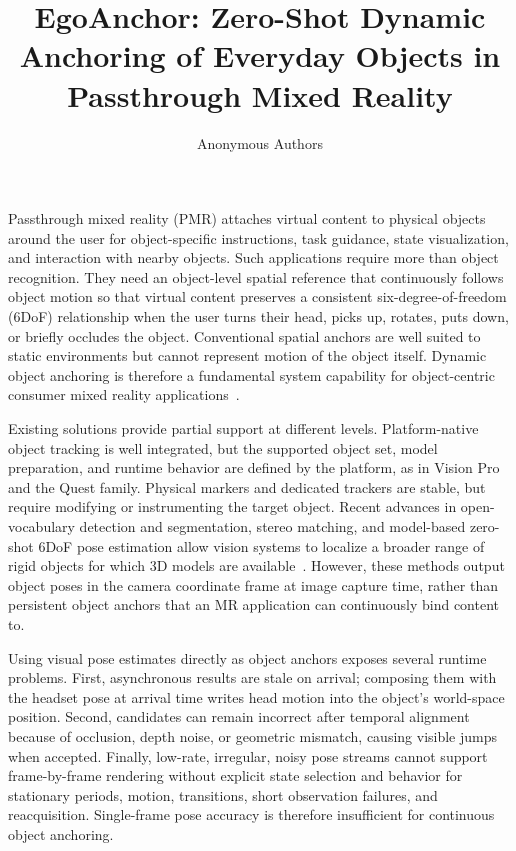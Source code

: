 \documentclass[review]{vgtc}
\title{EgoAnchor: Zero-Shot Dynamic Anchoring of Everyday Objects in Passthrough Mixed Reality}
\author{Anonymous Authors}
\begin{document}
\label{sec:introduction}
\maketitle

Passthrough mixed reality (PMR) attaches virtual content to physical objects around the user for object-specific instructions, task guidance, state visualization, and interaction with nearby objects. Such applications require more than object recognition. They need an object-level spatial reference that continuously follows object motion so that virtual content preserves a consistent six-degree-of-freedom (6DoF) relationship when the user turns their head, picks up, rotates, puts down, or briefly occludes the object. Conventional spatial anchors are well suited to static environments but cannot represent motion of the object itself. Dynamic object anchoring is therefore a fundamental system capability for object-centric consumer mixed reality applications~\cite{selfblending2026,gradualreality2024}.

Existing solutions provide partial support at different levels. Platform-native object tracking is well integrated, but the supported object set, model preparation, and runtime behavior are defined by the platform, as in Vision Pro and the Quest family. Physical markers and dedicated trackers are stable, but require modifying or instrumenting the target object. Recent advances in open-vocabulary detection and segmentation, stereo matching, and model-based zero-shot 6DoF pose estimation allow vision systems to localize a broader range of rigid objects for which 3D models are available~\cite{groundingdino2025,cutie2024,fastfoundationstereo2026,foundationpose2024,gigapose2024}. However, these methods output object poses in the camera coordinate frame at image capture time, rather than persistent object anchors that an MR application can continuously bind content to.

Using visual pose estimates directly as object anchors exposes several runtime problems. First, asynchronous results are stale on arrival; composing them with the headset pose at arrival time writes head motion into the object's world-space position. Second, candidates can remain incorrect after temporal alignment because of occlusion, depth noise, or geometric mismatch, causing visible jumps when accepted. Finally, low-rate, irregular, noisy pose streams cannot support frame-by-frame rendering without explicit state selection and behavior for stationary periods, motion, transitions, short observation failures, and reacquisition. Single-frame pose accuracy is therefore insufficient for continuous object anchoring.
\end{document}
